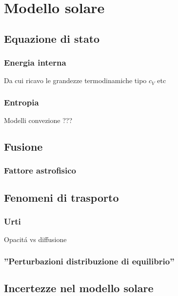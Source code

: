 \documentclass[../main.tex]{subfiles}
\begin{document}
\chapter{Modello solare}


\begin{refsection}
\nocite{*}
\begingroup
\let\clearpage\relax
\printbibliography
\endgroup

\section{Equazione di stato}

\subsection{Energia interna}

Da cui ricavo le grandezze termodinamiche tipo $c_V$ etc

\subsection{Entropia}

Modelli convezione ???

\section{Fusione}

\subsection{Fattore astrofisico}

\section{Fenomeni di trasporto}

\subsection{Urti}

Opacit\'a vs diffusione

\subsection{''Perturbazioni distribuzione di equilibrio''}


\section{Incertezze nel modello solare}


\end{refsection}
\end{document}

